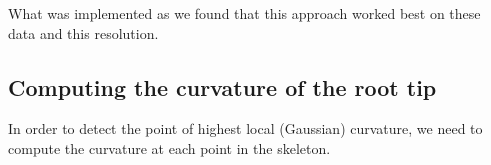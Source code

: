 What was implemented as we found that this approach worked best on these data and this resolution.


\subsection{Computing the curvature of the root tip}

In order to detect the point of highest local (Gaussian) curvature, we need to compute the curvature at each point in the skeleton. 




%
% 
%
%








